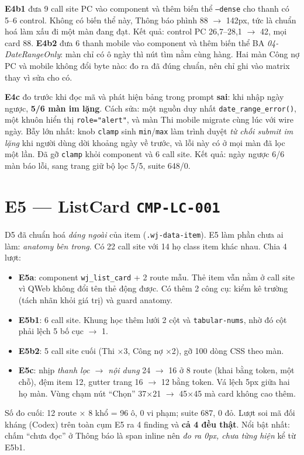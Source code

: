 \textbf{E4b1} đưa 9 call site PC vào component và thêm biến thể \texttt{--dense} cho thanh có 5--6 control.
Không có biến thể này, Thông báo phình 88 $\to$ 142px, tức là chuẩn hoá làm xấu đi một màn đang đạt.
Kết quả: control PC 26,7--28,1 $\to$ 42, mọi card 88. \textbf{E4b2} đưa 6 thanh mobile vào component và
thêm biến thể BA \emph{04-DateRangeOnly}: màn chỉ có ô ngày thì nút tìm nằm cùng hàng. Hai màn Công nợ
PC và mobile không đổi byte nào: đo ra đã đúng chuẩn, nên chỉ ghi vào matrix thay vì sửa cho có.

\textbf{E4c} đo trước khi đọc mã và phát hiện bảng trong prompt \textbf{sai}: khi nhập ngày ngược,
\textbf{5/6 màn im lặng}. Cách sửa: một nguồn duy nhất \texttt{date\_range\_error()}, một khuôn hiển thị
\texttt{role="alert"}, và màn Thi mobile migrate cùng lúc với wire ngày. Bẫy lớn nhất: knob \texttt{clamp}
sinh \texttt{min}/\texttt{max} làm trình duyệt \emph{từ chối submit im lặng} khi người dùng dời khoảng ngày
về trước, và lỗi này có ở mọi màn đã lọc một lần. Đã gỡ \texttt{clamp} khỏi component và 6 call site.
Kết quả: ngày ngược 6/6 màn báo lỗi, sang trang giữ bộ lọc 5/5, suite 648/0.

\section{E5 --- ListCard \texttt{CMP-LC-001}}

D5 đã chuẩn hoá \emph{dáng ngoài} của item (\texttt{.wj-data-item}). E5 làm phần chưa ai làm:
\emph{anatomy bên trong}. Có 22 call site với 14 họ class item khác nhau. Chia 4 lượt:
\begin{itemize}[nosep]
\item \textbf{E5a}: component \texttt{wj\_list\_card} + 2 route mẫu. Thẻ item vẫn nằm ở call site vì QWeb
  không đổi tên thẻ động được. Có thêm 2 công cụ: kiểm kê trường (tách nhãn khỏi giá trị) và guard anatomy.
\item \textbf{E5b1}: 6 call site. Khung học thêm lưới 2 cột và \texttt{tabular-nums}, nhờ đó cột phải
  lệch 5 bố cục $\to$ 1.
\item \textbf{E5b2}: 5 call site cuối (Thi ×3, Công nợ ×2), gỡ 100 dòng CSS theo màn.
\item \textbf{E5c}: nhịp \emph{thanh lọc $\to$ nội dung} 24 $\to$ 16 ở 8 route (khai bằng token, một chỗ),
  đệm item 12, gutter trang 16 $\to$ 12 bằng token. Vá lệch 5px giữa hai họ màn. Vùng chạm nút ``Chọn''
  37×21 $\to$ 45×45 mà card không cao thêm.
\end{itemize}
Số đo cuối: 12 route × 8 khổ = 96 ô, 0 vi phạm; suite 687, 0 đỏ. Lượt soi mã đối kháng (Codex) trên toàn
cụm E5 ra 4 finding và \textbf{cả 4 đều thật}. Nổi bật nhất: chấm ``chưa đọc'' ở Thông báo là span inline
nên \emph{đo ra 0px, chưa từng hiện} kể từ E5b1.

